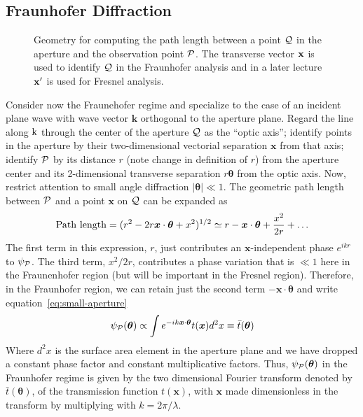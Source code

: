 \documentclass{article}
\def\cl#1{{\cal #1}}               %
\def\labs{\mid\!}
\def\rabs{\!\mid}
\begin{document}
\subsection*{Fraunhofer Diffraction}

\begin{figure}[th!]
  \hfil{}\hfil
  \caption{Geometry for computing the path length between a point $\cal{Q}$ in 
the aperture and the observation point $\cal{P}$. The transverse vector 
$\bf{x}$ is used to identify $\cal{Q}$ in the Fraunhofer analysis and in a
later lecture $\bf{x'}$ is used for Fresnel analysis.}
  \label{fig:path-length}
\end{figure}

Consider now the Fraunehofer regime and specialize to the case of an incident plane wave with
 wave vector ${\bm k}$ orthogonal to the aperture plane. Regard the line along ${\rm k}$ through
the center of the aperture $\cl{Q}$ as the ``optic axis''; identify points in the aperture by
their two-dimensional vectorial separation ${\bm x}$ from that axis; identify $\cl{P}$ by 
its distance $r$  (note change in definition of $r$) 
from the aperture center and its 2-dimensional transverse separation 
$r{\bm\theta}$ from the optic axis. Now, restrict attention to small angle diffraction
$\labs{\bm\theta}\rabs\ll 1$. The geometric path length between $\cl{P}$ and a point ${\bm x}$ on 
$\cl{Q}$ can be expanded as
\[
{\rm Path~length}=(r^2-2r{\bm x}\cdot{\bm\theta}+x^2)^{1/2}
       \simeq r-{\bm x}\cdot{\bm\theta}+{x^2\over 2r}+\ldots
\]
The first term in this expression, $r$, just contributes an ${\bm x}$-independent phase
$e^{ikr}$ to $\psi_\cl{P}$. The third term, ${x^2/2r}$, contributes a phase variation that is
$\ll 1$ here in the Fraunenhofer region (but will be important in the Fresnel region). Therefore, 
in the Fraunhofer region, we can retain just the second term $-{\bm x}\cdot{\bm\theta}$ and
write equation~\ref{eq:small-aperture} 
\[
\psi_\cl{P}({\bm\theta})\propto\int e^{-ik{\bm x}\cdot{\bm\theta}}t({\bm x})d^2x
     \equiv\bar{t}({\bm\theta})
\]
Where $d^2x$ is the surface area element in the aperture plane and we have dropped a constant
phase factor and constant multiplicative factors. Thus, $\psi_\cl{P}({\bm\theta})$ in the 
Fraunhofer regime is given by the two dimensional Fourier transform denoted by 
$\bar{t}({\bm\theta})$, of the transmission function $t({\bm x})$, with ${\bm x}$ made 
dimensionless in the transform by multiplying with $k={2\pi/\lambda}$. 
\end{document}
